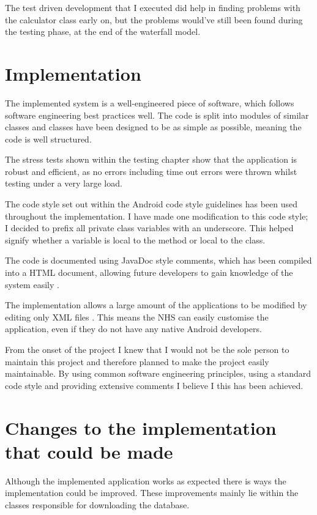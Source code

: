 The test driven development \cite{tdd} that I executed did help in finding problems with the calculator class early on, but the problems would’ve still been found during the testing phase, at the end of the waterfall model.


\section{Implementation}

The implemented system is a well-engineered piece of software, which follows software engineering best practices well. The code is split into modules of similar classes and classes have been designed to be as simple as possible, meaning the code is well structured. 

The stress tests shown within the testing chapter show that the application is robust and efficient, as no errors including time out errors were thrown whilst testing under a very large load.

The code style set out within the Android code style guidelines \cite{code_style} has been used throughout the implementation. I have made one modification to this code style; I decided to prefix all private class variables with an underscore. This helped signify whether a variable is local to the method or local to the class.

The code is documented using JavaDoc \cite{javadoc} style comments, which has been compiled into a HTML document, allowing future developers to gain knowledge of the system easily \cite{javadoc}. 

The implementation allows a large amount of the applications to be modified by editing only XML files \cite{xml}. This means the NHS can easily customise the application, even if they do not have any native Android developers.

From the onset of the project I knew that I would not be the sole person to maintain this project and therefore planned to make the project easily maintainable. By using common software engineering principles, using a standard code style and providing extensive comments I believe I this has been achieved.


\section{Changes to the implementation that could be made}

Although the implemented application works as expected there is ways the implementation could be improved. These improvements mainly lie within the classes responsible for downloading the database.

